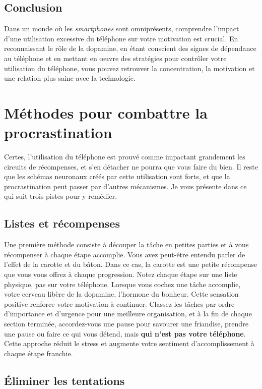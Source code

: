 \documentclass[a4paper, 12pt, garamond]{book}
\begin{document}
\subsection{Conclusion}

Dans un monde où les \textit{smartphones} sont omniprésents, comprendre l'impact
d'une utilisation excessive du téléphone sur votre motivation est crucial. En
reconnaissant le rôle de la dopamine, en étant conscient des signes de
dépendance au téléphone et en mettant en œuvre des stratégies pour contrôler
votre utilisation du téléphone, vous pouvez retrouver la concentration, la
motivation et une relation plus saine avec la technologie.

\section{Méthodes pour combattre la procrastination}
Certes, l'utilisation du téléphone est prouvé comme impactant grandement les
circuits de récompenses, et s'en détacher ne pourra que vous faire du bien. Il
reste que les schémas neuronaux créés par cette utilisation sont forts, et que
la procrastination peut passer par d'autres mécanismes. Je vous présente dans ce
qui suit trois pistes pour y remédier.

\subsection{Listes et récompenses}

Une première méthode consiste à découper la tâche en petites parties et à vous
récompenser à chaque étape accomplie. Vous avez peut-être entendu parler de
l'effet de la carotte et du bâton. Dans ce cas, la carotte est une petite
récompense que vous vous offrez à chaque progression. Notez chaque étape sur une
liste physique, pas sur votre téléphone. Lorsque vous cochez une tâche
accomplie, votre cerveau libère de la dopamine, l'hormone du bonheur. Cette
sensation positive renforce votre motivation à continuer. Classez les tâches par
ordre d'importance et d'urgence pour une meilleure organisation, et à la fin de
chaque section terminée, accordez-vous une pause pour savourer une friandise,
prendre une pause ou faire ce qui vous détend, mais \textbf{qui n'est pas votre
	téléphone}. Cette approche réduit le stress et augmente votre sentiment
d'accomplissement à chaque étape franchie.

\subsection{Éliminer les tentations}
\end{document}
